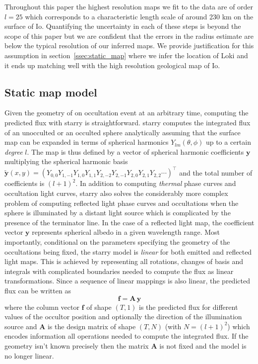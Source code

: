 \documentclass[modern]{aastex62}
\begin{document}
Throughout this paper the highest resolution maps we fit to the data are of order $l=25$ which corresponds to a characteristic length scale of around 230 km on the surface of Io.
Quantifying the uncertainty in each of these steps is beyond the scope of this paper but we are confident that the errors in the radius estimate are below the typical resolution of our inferred maps. 
We provide justification for this assumption in section~\ref{ssec:static_map} where we infer the location of Loki and it ends up matching well with the high resolution geological map of Io.

\subsection{Static map model}
\label{ssec:static}
Given the geometry of on occultation event at an arbitrary time, computing the predicted flux with \textsf{starry} is straightforward.
\textsf{starry} computes the integrated flux of an unocculted or an occulted sphere analytically assuming that the surface map can be expanded in terms of spherical harmonics $Y_{lm}(\theta,\phi)$ up to a certain \emph{degree} $l$.
The map is thus defined by a vector of spherical harmonic coefficients $\mathbf{y}$ multiplying the spherical harmonic basis $\tilde{\mathbf{y}}(x, y)=\left(Y_{0,0} Y_{1,-1} Y_{1,0} Y_{1,1} Y_{2,-2} Y_{2,-1} Y_{2,0} Y_{2,1} Y_{2,2} \cdots\right)^{\top}$ and the total number of coefficients is $(l+1)^2$.
In addition to computing \emph{thermal} phase curves and occultation light curves, \textsf{starry} also solves the considerably more complex problem of computing reflected light phase curves and occultations when the sphere is illuminated by a distant light source \citep[Luger et al. 2020 in prep][]{} which is complicated by the presence of the terminator line.
In the case of a reflected light map, the coefficient vector $\mathbf{y}$ represents spherical albedo in a given wavelength range.
Most importantly, conditional on the parameters specifying the geometry of the occultations being fixed, the \textsf{starry} model is \emph{linear} for both emitted and reflected light maps.
This is achieved by representing all rotations, changes of basis and integrals with complicated boundaries needed to compute the flux as linear transformations.
Since a sequence of linear mappings is also linear, the predicted flux can be written as
\begin{equation}
    \mathbf{f}=\mathbf{A}\,\mathbf{y}
    \label{eq:linear_model}
\end{equation}
where the column vector $\mathbf{f}$ of shape $(T, 1)$ is the predicted flux for different values of the occultor position and optionally the direction of the illumination source and $\mathbf{A}$ is the design
matrix of shape $(T, N)$ (with $N=(l+1)^2$) which encodes information all operations needed to compute the integrated flux.
If the geometry isn't known precisely then the matrix $\mathbf{A}$ is not fixed and the model is no longer linear.
\end{document}
